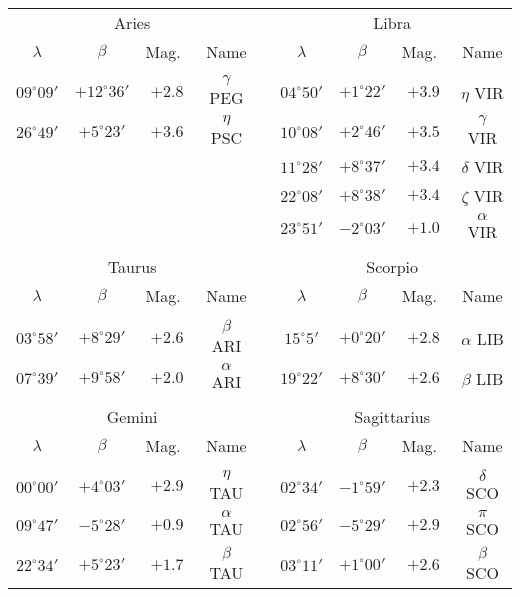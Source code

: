 \clearpage
\newpage
\begin{table}
\centering
{\small
\begin{tabular}{ccccccccc}
\multicolumn{4}{c}{Aries} && \multicolumn{4}{c}{Libra}\\
$\lambda$ & $\beta$ & Mag.\ & Name  && $\lambda$ & $\beta$ & Mag.\ & Name \\\cline{1-4}\cline{6-9}
&&&&&&&\\[-1.75ex]
$09^\circ 09'$ & $+12^\circ 36'$ & $+2.8$ & $\gamma$ PEG&&
$04^\circ 50'$ & $+1^\circ 22'$ & $+3.9$ & $\eta$ VIR\\
$26^\circ 49'$ & $+5^\circ 23'$ & $+3.6$ & $\eta$ PSC &&
$10^\circ 08'$ & $+2^\circ 46'$ & $+3.5$ & $\gamma$ VIR\\
&&&&&
$11^\circ 28'$ &  $+8^\circ 37'$ &  $+3.4$ & $\delta$   VIR\\
&&&&&
$22^\circ 08'$ & $+8^\circ 38'$ &  $+3.4$ & $\zeta$    VIR\\
&&&&&
$23^\circ 51'$  & $-2^\circ 03'$ &  $+1.0$ & $\alpha$   VIR\\
\multicolumn{8}{c}{}\\
\multicolumn{4}{c}{Taurus} && \multicolumn{4}{c}{Scorpio}\\
$\lambda$ & $\beta$ & Mag.\ & Name  && $\lambda$ & $\beta$ & Mag.\ & Name \\\cline{1-4}\cline{6-9}
&&&&&&&&\\[-1.75ex]
$03^\circ 58'$ &   $+8^\circ 29'$ &  $+2.6$ &  $\beta$    ARI &&
$15^\circ 5'$ &  $+0^\circ 20'$ &  $+2.8$ &   $\alpha$ LIB\\
$07^\circ 39'$ &  $+9^\circ 58'$ &  $+2.0$ &  $\alpha$   ARI &&
$19^\circ 22'$  & $+8^\circ 30'$  & $+2.6$ &  $\beta$    LIB\\
\multicolumn{8}{c}{}\\
\multicolumn{4}{c}{Gemini} && \multicolumn{4}{c}{Sagittarius}\\
$\lambda$ & $\beta$ & Mag.\ & Name  && $\lambda$ & $\beta$ & Mag.\ & Name \\\cline{1-4}\cline{6-9}
&&&&&&&&\\[-1.75ex]
$00^\circ 00'$ & $+4^\circ 03'$ &  $+2.9$ & $\eta$     TAU &&
$02^\circ 34'$  & $-1^\circ 59'$ &  $+2.3$ & $\delta$   SCO\\
$09^\circ 47'$ &  $-5^\circ 28'$ &  $+0.9$ &  $\alpha$   TAU && 
$02^\circ 56'$ & $ -5^\circ 29'$  & $+2.9$ &  $\pi$      SCO\\
$22^\circ 34'$ &  $+5^\circ 23'$ &  $+1.7$ & $\beta$    TAU &&
$03^\circ 11'$  & $+1^\circ 00'$ &  $+2.6$ &$\beta$  SCO\\

\end{tabular}}
\end{table}

